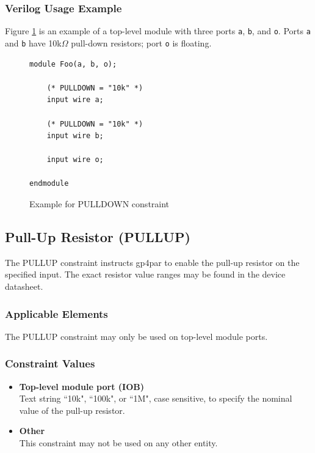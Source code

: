 \documentclass{article}
\begin{document}
\subsubsection{Verilog Usage Example}

Figure \ref{constraint-pulldown} is an example of a top-level module with three ports \texttt{a}, \texttt{b}, and
\texttt{o}. Ports \texttt{a} and \texttt{b} have 10k$\Omega$ pull-down resistors; port \texttt{o} is floating.

\begin{figure}[h]
\begin{lstlisting}
module Foo(a, b, o);

	(* PULLDOWN = "10k" *)
	input wire a;

	(* PULLDOWN = "10k" *)
	input wire b;

	input wire o;
	
endmodule
\end{lstlisting}
\caption{Example for PULLDOWN constraint}
\label{constraint-pulldown}
\end{figure}


\pagebreak
\subsection{Pull-Up Resistor (PULLUP)}

The PULLUP constraint instructs gp4par to enable the pull-up resistor on the specified input. The exact resistor 
value ranges may be found in the device datasheet.

\subsubsection{Applicable Elements}
The PULLUP constraint may only be used on top-level module ports. 

\subsubsection{Constraint Values}
\begin{itemize}
\item {\bfseries Top-level module port (IOB)}\\
Text string ``10k", ``100k", or ``1M", case sensitive, to specify the nominal value of the pull-up resistor.
\item {\bfseries Other} \\
This constraint may not be used on any other entity.
\end{itemize}
\end{document}
